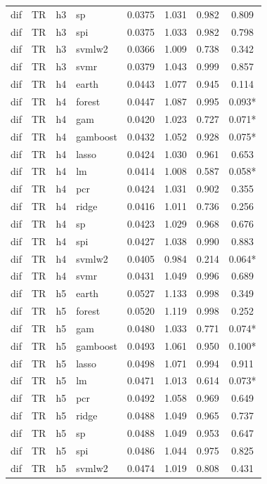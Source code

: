 \begin{ThreePartTable}
\begin{longtable}[t]{llclcccc}
dif & TR & h3 & sp & 0.0375 & 1.031 & 0.982 & 0.809\\
dif & TR & h3 & spi & 0.0375 & 1.033 & 0.982 & 0.798\\
dif & TR & h3 & svmlw2 & 0.0366 & 1.009 & 0.738 & 0.342\\
dif & TR & h3 & svmr & 0.0379 & 1.043 & 0.999 & 0.857\\
\addlinespace
dif & TR & h4 & earth & 0.0443 & 1.077 & 0.945 & 0.114\\
dif & TR & h4 & forest & 0.0447 & 1.087 & 0.995 & 0.093*\\
dif & TR & h4 & gam & 0.0420 & 1.023 & 0.727 & 0.071*\\
dif & TR & h4 & gamboost & 0.0432 & 1.052 & 0.928 & 0.075*\\
dif & TR & h4 & lasso & 0.0424 & 1.030 & 0.961 & 0.653\\
dif & TR & h4 & lm & 0.0414 & 1.008 & 0.587 & 0.058*\\
dif & TR & h4 & pcr & 0.0424 & 1.031 & 0.902 & 0.355\\
dif & TR & h4 & ridge & 0.0416 & 1.011 & 0.736 & 0.256\\
dif & TR & h4 & sp & 0.0423 & 1.029 & 0.968 & 0.676\\
dif & TR & h4 & spi & 0.0427 & 1.038 & 0.990 & 0.883\\
dif & TR & h4 & svmlw2 & 0.0405 & 0.984 & 0.214 & 0.064*\\
dif & TR & h4 & svmr & 0.0431 & 1.049 & 0.996 & 0.689\\
\addlinespace
dif & TR & h5 & earth & 0.0527 & 1.133 & 0.998 & 0.349\\
dif & TR & h5 & forest & 0.0520 & 1.119 & 0.998 & 0.252\\
dif & TR & h5 & gam & 0.0480 & 1.033 & 0.771 & 0.074*\\
dif & TR & h5 & gamboost & 0.0493 & 1.061 & 0.950 & 0.100*\\
dif & TR & h5 & lasso & 0.0498 & 1.071 & 0.994 & 0.911\\
dif & TR & h5 & lm & 0.0471 & 1.013 & 0.614 & 0.073*\\
dif & TR & h5 & pcr & 0.0492 & 1.058 & 0.969 & 0.649\\
dif & TR & h5 & ridge & 0.0488 & 1.049 & 0.965 & 0.737\\
dif & TR & h5 & sp & 0.0488 & 1.049 & 0.953 & 0.647\\
dif & TR & h5 & spi & 0.0486 & 1.044 & 0.975 & 0.825\\
dif & TR & h5 & svmlw2 & 0.0474 & 1.019 & 0.808 & 0.431\\

\end{longtable}
\end{ThreePartTable}
